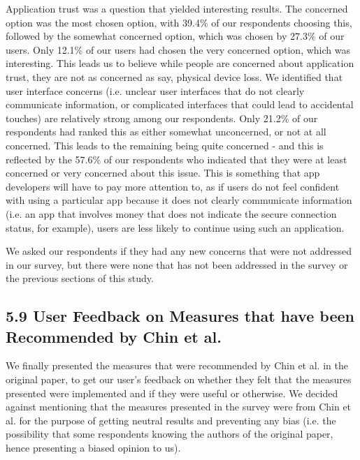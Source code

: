 \documentclass{sigchi}
\begin{document}
Application trust was a question that yielded interesting results. The concerned option was the most chosen option, with 39.4\% of our respondents choosing this, followed by the somewhat concerned option, which was chosen by 27.3\% of our users. Only 12.1\% of our users had chosen the very concerned option, which was interesting. This leads us to believe while people are concerned about application trust, they are not as concerned as say, physical device loss. We identified that user interface concerns (i.e. unclear user interfaces that do not clearly communicate information, or complicated interfaces that could lead to accidental touches) are relatively strong among our respondents. Only 21.2\% of our respondents had ranked this as either somewhat unconcerned, or not at all concerned. This leads to the remaining being quite concerned - and this is reflected by the 57.6\% of our respondents who indicated that they were at least concerned or very concerned about this issue. This is something that app developers will have to pay more attention to, as if users do not feel confident with using a particular app because it does not clearly communicate information (i.e. an app that involves money that does not indicate the secure connection status, for example), users are less likely to continue using such an application.

We asked our respondents if they had any new concerns that were not addressed in our survey, but there were none that has not been addressed in the survey or the previous sections of this study.

\subsection{5.9 User Feedback on Measures that have been Recommended by Chin et al.}


We finally presented the measures that were recommended by Chin et al. in the original paper, to get our user's feedback on whether they felt that the measures presented were implemented and if they were useful or otherwise. We decided against mentioning that the measures presented in the survey were from Chin et al. for the purpose of getting neutral results and preventing any bias (i.e. the possibility that some respondents knowing the authors of the original paper, hence presenting a biased opinion to us).
\end{document}
